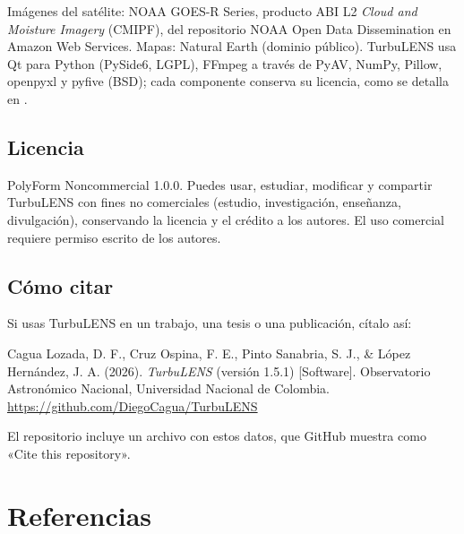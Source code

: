 Imágenes del satélite: NOAA GOES-R Series, producto ABI L2 \emph{Cloud and Moisture Imagery} (CMIPF), del repositorio
NOAA Open Data Dissemination en Amazon Web Services. Mapas: Natural Earth (dominio público). TurbuLENS usa Qt para Python
(PySide6, LGPL), FFmpeg a través de PyAV, NumPy, Pillow, openpyxl y pyfive (BSD); cada componente conserva su licencia,
como se detalla en .

\section*{Licencia}\label{sec:licencia}

PolyForm Noncommercial 1.0.0. Puedes usar, estudiar, modificar y compartir TurbuLENS con fines no comerciales (estudio,
investigación, enseñanza, divulgación), conservando la licencia y el crédito a los autores. El uso comercial requiere
permiso escrito de los autores.

\section*{Cómo citar}\label{sec:citar}

Si usas TurbuLENS en un trabajo, una tesis o una publicación, cítalo así:
\begin{tcolorbox}[enhanced,colback=suave,colframe=suave,arc=2mm,left=4mm,right=4mm,fontupper=\small]
Cagua Lozada, D. F., Cruz Ospina, F. E., Pinto Sanabria, S. J., \& López Hernández, J. A. (2026). \emph{TurbuLENS} (versión 1.5.1) [Software].
Observatorio Astronómico Nacional, Universidad Nacional de Colombia. \url{https://github.com/DiegoCagua/TurbuLENS}
\end{tcolorbox}
El repositorio incluye un archivo  con estos datos, que GitHub muestra como «Cite this repository».


\chapter{Referencias}\label{ap:referencias}

